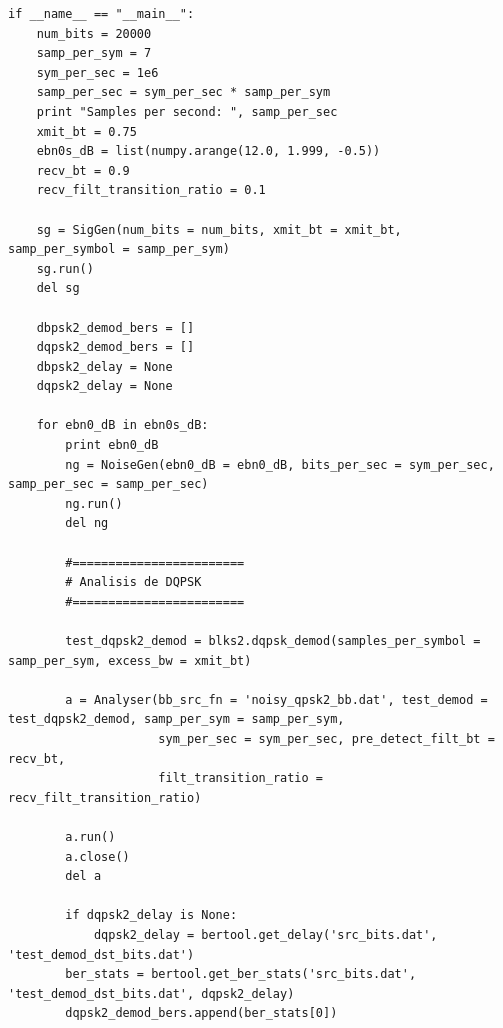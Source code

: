 \begin{lstlisting}[float=hp, breaklines=true]
if __name__ == "__main__":
    num_bits = 20000
    samp_per_sym = 7
    sym_per_sec = 1e6
    samp_per_sec = sym_per_sec * samp_per_sym
    print "Samples per second: ", samp_per_sec
    xmit_bt = 0.75
    ebn0s_dB = list(numpy.arange(12.0, 1.999, -0.5))
    recv_bt = 0.9
    recv_filt_transition_ratio = 0.1

    sg = SigGen(num_bits = num_bits, xmit_bt = xmit_bt, samp_per_symbol = samp_per_sym)
    sg.run()
    del sg

    dbpsk2_demod_bers = []
    dqpsk2_demod_bers = []
    dbpsk2_delay = None
    dqpsk2_delay = None

    for ebn0_dB in ebn0s_dB:
        print ebn0_dB
        ng = NoiseGen(ebn0_dB = ebn0_dB, bits_per_sec = sym_per_sec, samp_per_sec = samp_per_sec)
        ng.run()
        del ng

        #========================
        # Analisis de DQPSK
        #========================

        test_dqpsk2_demod = blks2.dqpsk_demod(samples_per_symbol = samp_per_sym, excess_bw = xmit_bt)

        a = Analyser(bb_src_fn = 'noisy_qpsk2_bb.dat', test_demod = test_dqpsk2_demod, samp_per_sym = samp_per_sym,
                     sym_per_sec = sym_per_sec, pre_detect_filt_bt = recv_bt,
                     filt_transition_ratio = recv_filt_transition_ratio)

        a.run()
        a.close()
        del a

        if dqpsk2_delay is None:
            dqpsk2_delay = bertool.get_delay('src_bits.dat', 'test_demod_dst_bits.dat')
        ber_stats = bertool.get_ber_stats('src_bits.dat', 'test_demod_dst_bits.dat', dqpsk2_delay)
        dqpsk2_demod_bers.append(ber_stats[0])
\end{lstlisting}

